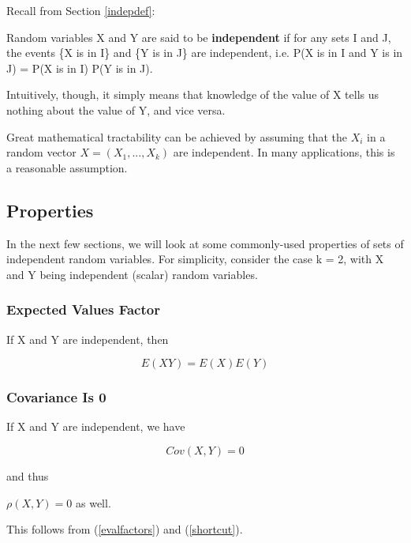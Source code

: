 Recall from Section \ref{indepdef}:

\begin{definition}

Random variables X and Y are said to be {\bf independent} if for any
sets I and J, the events \{X is in I\} and \{Y is in J\} are 
independent, i.e.  P(X is in I and Y is in J) = P(X is in I) P(Y is in
J). 

\end{definition}

Intuitively, though, it simply means that knowledge of the value of X
tells us nothing about the value of Y, and vice versa.

Great mathematical tractability can be achieved by assuming that the
$X_i$ in a random vector $X = (X_1,...,X_k)$ are independent.  In many
applications, this is a reasonable assumption.

\subsection{Properties}

In the next few sections, we will look at some commonly-used properties
of sets of independent random variables.  For simplicity, consider the
case k = 2, with X and Y being independent (scalar) random variables.

\subsubsection{Expected Values Factor}

If X and Y are independent, then 

\begin{equation}
\label{evalfactors}
E(XY) = E(X) E(Y)
\end{equation}

\subsubsection{Covariance Is 0}

If X and Y are independent, we have

\begin{equation}
\label{cov0}
Cov(X,Y) = 0
\end{equation}

and thus

$\rho(X,Y) = 0$ as well.

This follows from (\ref{evalfactors}) and (\ref{shortcut}).

